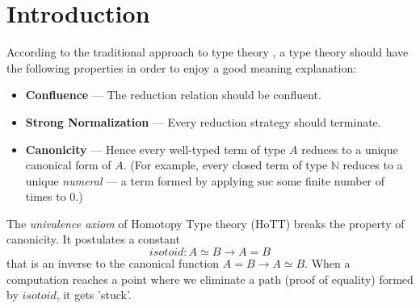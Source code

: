 \usepackage{amsmath}
\usepackage{amssymb}
\usepackage{bbm}
\usepackage[greek,english]{babel}
\usepackage{framed}
\usepackage{ucs}
\usepackage[utf8x]{inputenc}
\usepackage{autofe}
\usepackage{proof}
\usepackage{stmaryrd}
\usepackage{textalpha}
\usepackage{todo}



\newtheorem{prop}[theorem]{Proposition}
\newtheorem{lm}[theorem]{Lemma}

\newcommand{\Set}{\mathbf{Set}}
\newcommand{\eqdef}{\mathrel{\smash{\stackrel{\text{def}}{=}}}}
\newcommand{\AgdaHide}[1]{}
\newcommand{\isotoid}{\ensuremath{isotoid}}
\newcommand{\vald}{\ensuremath{\ \mathrm{valid}}}
\newcommand{\reff}[1]{\ensuremath{\mathsf{ref} \left( {#1} \right)}}
\newcommand{\univ}[4]{\ensuremath{\mathsf{univ}_{{#1} , {#2}} \left( {#3} , {#4} \right)}}
\newcommand{\triplelambda}{\ensuremath{\lambda \!\! \lambda \!\! \lambda}}
\newcommand{\SN}{\ensuremath{\mathbf{SN}}}
\newcommand{\dom}{\ensuremath{\operatorname{dom}}}
\newcommand{\sym}[1]{\ensuremath{\mathsf{sym} \left( {#1} \right)}}
\newcommand{\trans}[2]{\ensuremath{\mathsf{trans} \left( {#1} , {#2} \right)}}



\maketitle

\section{Introduction}

According to the traditional approach to type theory , a type theory should have the
following properties in order to enjoy a good meaning explanation:
\begin{itemize}
\item \textbf{Confluence} --- The reduction relation should be confluent.
\item \textbf{Strong Normalization} --- Every reduction strategy should terminate.
\item \textbf{Canonicity} --- Hence every well-typed term of type $A$ reduces to a unique canonical form of $A$.  (For example,
every closed term of type $\mathbb{N}$ reduces to a unique \emph{numeral} --- a term formed by applying $\mathrm{suc}$ some
finite number of times to 0.)
\end{itemize}

The \emph{univalence axiom} of Homotopy Type theory (HoTT)  breaks the property of canonicity.  It postulates a
constant
\[ \isotoid : A \simeq B \rightarrow A = B \]
that is an inverse to the canonical function $A = B \rightarrow A \simeq B$.  When a computation reaches a point
where we eliminate a path (proof of equality) formed by $\isotoid$, it gets 'stuck'.

